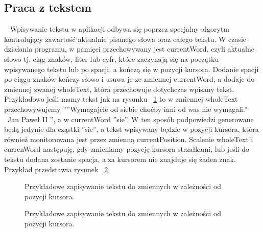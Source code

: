 \documentclass[twoside,a4paper]{book}
\begin{document}
\subsection{Praca z tekstem}~\label{sec:text}
Wpisywanie tekstu w aplikacji odbywa się poprzez specjalny algorytm kontrolujący zawartość aktualnie pisanego słowa oraz całego tekstu. W czasie działania programu, w pamięci przechowywany jest currentWord, czyli aktualne słowo tj. ciąg znaków, liter lub cyfr, które zaczynają się na początku wpisywanego tekstu lub po spacji, a kończą się w pozycji kursora. Dodanie spacji po ciągu znaków kończy słowo i usuwa je ze zmiennej currentWord, a dodaje do zmiennej zwanej wholeText, która przechowuje dotychczas wpisany tekst. Przykładowo jeśli mamy tekst jak na rysunku ~\ref{fig:sentence} to w zmiennej wholeText przechowywujemy ''''Wymagajcie od siebie choćby inni od was nie wymagali.'' ~Jan Paweł II '', a w currentWord ''sie''. W ten sposób podpowiedzi generowane będą jedynie dla cząstki ''sie'', a tekst wpisywany będzie w pozycji kursora, która również monitorowana jest przez zmienną currentPosition. Scalenie wholeText i currenWord następuję, gdy zmieniamy pozycję kursora strzałkami, lub jeśli do tekstu dodana zostanie spacja, a za kursorem nie znajduje się żaden znak. Przykład przedstawia rysunek ~\ref{fig:sentence2}. 
\begin{figure}[!h]
		\centering
		\caption{Przykładowe zapisywanie tekstu do zmiennych w zależności od pozycji kursora.}
		\label{fig:sentence}
\end{figure}
\begin{figure}[!h]
		\centering
		\caption{Przykładowe zapisywanie tekstu do zmiennych w zależności od pozycji kursora.}
		\label{fig:sentence2}
\end{figure}
\end{document}
